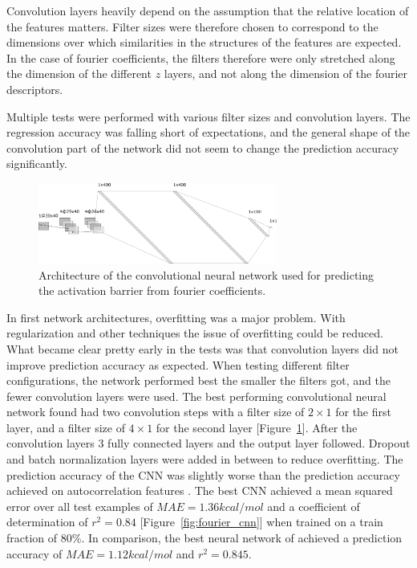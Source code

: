 Convolution layers heavily depend on the assumption that the relative location of the features matters.
Filter sizes were therefore chosen to correspond to the dimensions over which similarities in the structures of the features are expected.
In the case of fourier coefficients, the filters therefore were only stretched along the dimension of the different $z$ layers, and not along the dimension of the fourier descriptors.

Multiple tests were performed with various filter sizes and convolution layers.
The regression accuracy was falling short of expectations, and the general shape of the convolution part of the network did not seem to change the prediction accuracy significantly.

\begin{figure} [h]
    \centering
    \includegraphics[width=0.7\textwidth]{figures/regression/fourier/cnn/fourier_conv_layout.png} 
    \caption[Layout of LEFD CNN]{
        Architecture of the convolutional neural network used for predicting the activation barrier from fourier coefficients.
    }
    \label{fig:cnn-architecture}
\end{figure}

In first network architectures, overfitting was a major problem.
With regularization and other techniques the issue of overfitting could be reduced.
What became clear pretty early in the tests was that convolution layers did not improve prediction accuracy as expected.
When testing different filter configurations, the network performed best the smaller the filters got, and the fewer convolution layers were used.
The best performing convolutional neural network found had two convolution steps with a filter size of $2 \times 1$ for the first layer, and a filter size
of $4 \times 1$ for the second layer [Figure~\ref{fig:cnn-architecture}].
After the convolution layers 3 fully connected layers and the output layer followed.
Dropout and batch normalization layers were added in between to reduce overfitting.
The prediction accuracy of the CNN was slightly worse than the prediction accuracy achieved on autocorrelation features \cite{friederich_dos}.
The best CNN achieved a mean squared error over all test examples of $MAE=1.36 kcal/mol$ and a coefficient of determination of $r^2=0.84$ [Figure~\ref{fig:fourier_cnn}] when trained on a train fraction of 80\%.
In comparison, the best neural network of \cite{friederich_dos} achieved a prediction accuracy of $MAE=1.12 kcal/mol$ and $r^2=0.845$.

